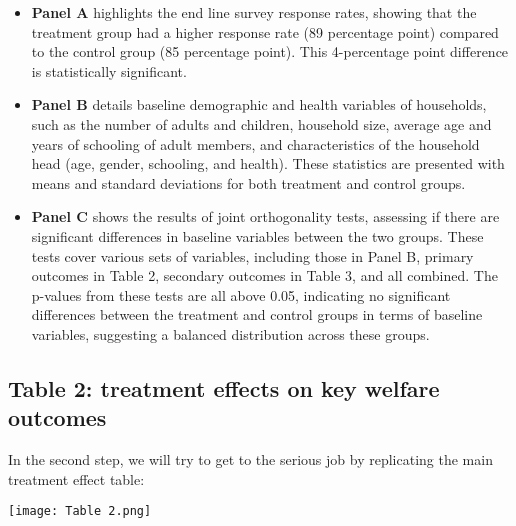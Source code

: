 \documentclass{article}
\begin{document}
\begin{itemize}

    \item  \textbf{Panel A} highlights the end line survey response rates, showing that the treatment group had a higher response rate (89 percentage point) compared to the control group (85 percentage point). This 4-percentage point difference is statistically significant.

    \item \textbf{Panel B} details baseline demographic and health variables of households, such as the number of adults and children, household size, average age and years of schooling of adult members, and characteristics of the household head (age, gender, schooling, and health). These statistics are presented with means and standard deviations for both treatment and control groups.

    \item \textbf{Panel C} shows the results of joint orthogonality tests, assessing if there are significant differences in baseline variables between the two groups. These tests cover various sets of variables, including those in Panel B, primary outcomes in Table 2, secondary outcomes in Table 3, and all combined. The p-values from these tests are all above 0.05, indicating no significant differences between the treatment and control groups in terms of baseline variables, suggesting a balanced distribution across these groups.

\end{itemize}




\subsection{Table 2: treatment effects on key welfare outcomes}
 
In the second step, we will try to get to the serious job by replicating the main treatment effect table: 

\texttt{[image: Table 2.png]}
\end{document}
